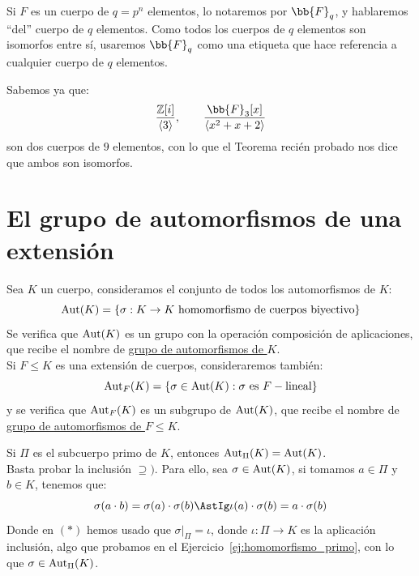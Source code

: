 \begin{notacion}
    Si $F$ es un cuerpo de $q=p^n$ elementos, lo notaremos por $\bb{F}_q$, y hablaremos ``del'' cuerpo de $q$ elementos. Como todos los cuerpos de $q$ elementos son isomorfos entre sí, usaremos $\bb{F}_q$ como una etiqueta que hace referencia a cualquier cuerpo de $q$ elementos.
\end{notacion}

\begin{ejemplo}
    Sabemos ya que:
    \begin{equation*}
        \dfrac{\mathbb{Z}[i]}{\langle 3 \rangle }, \qquad \dfrac{\bb{F}_3[x]}{\langle x^2+x+2 \rangle }
    \end{equation*}
    son dos cuerpos de $9$ elementos, con lo que el Teorema recién probado nos dice que ambos son isomorfos.
\end{ejemplo}

\section{El grupo de automorfismos de una extensión}
\begin{definicion}
    Sea $K$ un cuerpo, consideramos el conjunto de todos los automorfismos de $K$:
    \begin{equation*}
        \Aut(K) = \{\sigma:K\to K \text{\ homomorfismo de cuerpos biyectivo}\}
    \end{equation*}
    Se verifica que $\operatorname{Aut}(K)$ es un grupo con la operación composición de aplicaciones, que recibe el nombre de \underline{grupo de automorfismos de $K$}. \\

    \noindent
    Si $F\leq K$ es una extensión de cuerpos, consideraremos también:
    \begin{equation*}
        \Aut_F(K) = \{\sigma\in \Aut(K) : \sigma \text{\ es\ } F-\text{lineal}\}
    \end{equation*}
    y se verifica que $\operatorname{Aut}_F(K)$ es un subgrupo de $\operatorname{Aut}(K)$, que recibe el nombre de \underline{grupo de automorfismos de $F\leq K$}.\\
\end{definicion}

\begin{ejercicio}
    Si $\Pi$ es el subcuerpo primo de $K$, entonces $\operatorname{Aut}_\Pi(K) = \operatorname{Aut}(K)$.\\

    \noindent
    Basta probar la inclusión $\supseteq)$. Para ello, sea $\sigma\in \operatorname{Aut}(K)$, si tomamos $a\in \Pi$ y $b\in K$, tenemos que:
    \begin{equation*}
        \sigma(a\cdot b) = \sigma(a)\cdot \sigma(b) \AstIg \iota(a)\cdot \sigma(b) = a\cdot \sigma(b)
    \end{equation*}
    Donde en $(\ast)$ hemos usado que $\sigma\big|_\Pi=\iota$, donde $\iota:\Pi\to K$ es la aplicación inclusión, algo que probamos en el Ejercicio~\ref{ej:homomorfismo_primo}, con lo que $\sigma\in \operatorname{Aut}_\Pi(K)$.
\end{ejercicio}

